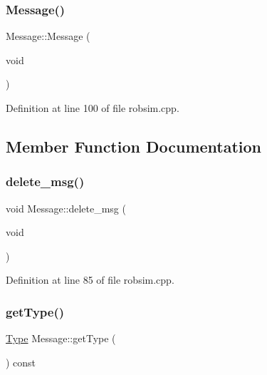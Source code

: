 \mbox{\label{classMessage_a4fc4f717b634e66070366cb7722d7761}} 
\subsubsection{\texorpdfstring{Message()}{Message()}\hspace{0.1cm}{\footnotesize\ttfamily [2/2]}}
{\footnotesize\ttfamily Message\+::\+Message (\begin{DoxyParamCaption}\item[{void}]{ }\end{DoxyParamCaption})}



Definition at line 100 of file robsim.\+cpp.



\subsection{Member Function Documentation}
\mbox{\label{classMessage_a503349764ac9e059395381da69375b5b}} 
\subsubsection{\texorpdfstring{delete\+\_\+msg()}{delete\_msg()}}
{\footnotesize\ttfamily void Message\+::delete\+\_\+msg (\begin{DoxyParamCaption}\item[{void}]{ }\end{DoxyParamCaption})}



Definition at line 85 of file robsim.\+cpp.

\mbox{\label{classMessage_a2d91ea6e9b207fac52a616c60a5664a8}} 
\subsubsection{\texorpdfstring{get\+Type()}{getType()}}
{\footnotesize\ttfamily \hyperlink{classMessage_a1c65ab3f02ba5b175f583f9d275ecf2b}{Type} Message\+::get\+Type (\begin{DoxyParamCaption}{ }\end{DoxyParamCaption}) const}

